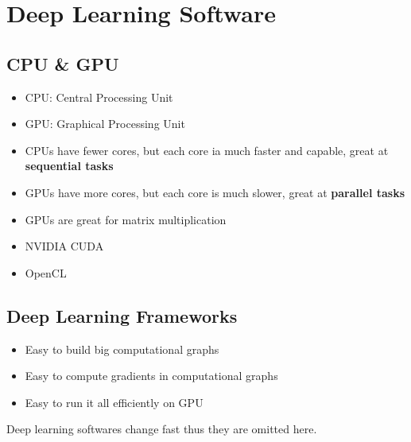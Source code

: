 \section{Deep Learning Software}
\subsection{CPU \& GPU}
\begin{itemize}
	\item CPU: Central Processing Unit
	\item GPU: Graphical Processing Unit
	\item CPUs have fewer cores, but each core ia much faster and capable, great at \textbf{sequential tasks}
	\item GPUs have more cores, but each core is much slower, great at \textbf{parallel tasks}
	\item GPUs are great for matrix multiplication
	\item NVIDIA CUDA
	\item OpenCL
\end{itemize}

\subsection{Deep Learning Frameworks}
\begin{itemize}
	\item Easy to build big computational graphs
	\item Easy to compute gradients in computational graphs
	\item Easy to run it all efficiently on GPU
\end{itemize}

Deep learning softwares change fast thus they are omitted here.